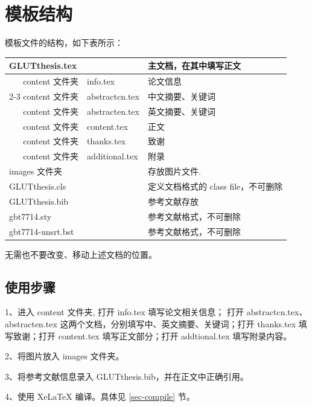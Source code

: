 \section{模板结构}

模板文件的结构，如下表所示：
\begin{table}[ht]\centering
\begin{tabular}{r|l|l}
	\hline
	\multicolumn{2}{l|}{GLUTthesis.tex }  & 主文档，在其中填写正文  \\ \hline
content 文件夹 & info.tex  & 论文信息  \\ \cline{2-3} \hline
content 文件夹 & abstractcn.tex & 中文摘要、关键词  \\ \hline
content 文件夹 & abstracten.tex & 英文摘要、关键词  \\ \hline
content 文件夹 & content.tex & 正文  \\ \hline
content 文件夹 &  thanks.tex & 致谢  \\ \hline
content 文件夹 & additional.tex & 附录  \\ \hline
	\multicolumn{2}{l|}{images 文件夹}                  & 存放图片文件.                   \\ \hline
	\multicolumn{2}{l|}{GLUTthesis.cls}             & 定义文档格式的 class file，不可删除 \\ \hline
	\multicolumn{2}{l|}{GLUTthesis.bib}             & 参考文献存放 \\ \hline
	\multicolumn{2}{l|}{gbt7714.sty}             & 参考文献格式，不可删除 \\ \hline
	\multicolumn{2}{l|}{gbt7714-unsrt.bst}             & 参考文献格式，不可删除 \\ \hline
\end{tabular}
\end{table}

无需也不要改变、移动上述文档的位置。

\subsection{使用步骤}

1、进入 content 文件夹,  打开 info.tex 填写论文相关信息；
打开 abstractcn.tex、abstracten.tex 这两个文档，分别填写中、英文摘要、关键词；打开 thanks.tex 填写致谢；打开 content.tex 填写正文部分；打开 addtional.tex 填写附录内容。

2、将图片放入 images 文件夹。

3、将参考文献信息录入 GLUTthesis.bib，并在正文中正确引用。

4、使用 XeLaTeX 编译。具体见 \ref{sec-compile} 节。



